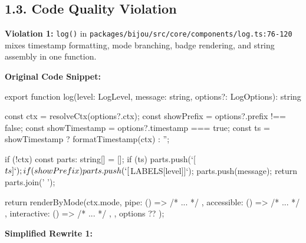 \subsection{1.3. Code Quality Violation}\label{record-418-code-quality-violation}

\textbf{Violation 1:} \texttt{l\allowbreak{}o\allowbreak{}g\allowbreak{}(\allowbreak{})} in \texttt{p\allowbreak{}a\allowbreak{}c\allowbreak{}k\allowbreak{}a\allowbreak{}g\allowbreak{}e\allowbreak{}s\allowbreak{}/\allowbreak{}b\allowbreak{}i\allowbreak{}j\allowbreak{}o\allowbreak{}u\allowbreak{}/\allowbreak{}s\allowbreak{}r\allowbreak{}c\allowbreak{}/\allowbreak{}c\allowbreak{}o\allowbreak{}r\allowbreak{}e\allowbreak{}/\allowbreak{}c\allowbreak{}o\allowbreak{}m\allowbreak{}p\allowbreak{}o\allowbreak{}n\allowbreak{}e\allowbreak{}n\allowbreak{}t\allowbreak{}s\allowbreak{}/\allowbreak{}l\allowbreak{}o\allowbreak{}g\allowbreak{}.\allowbreak{}t\allowbreak{}s\allowbreak{}:\allowbreak{}7\allowbreak{}6\allowbreak{}-\allowbreak{}1\allowbreak{}2\allowbreak{}0} mixes timestamp formatting, mode branching, badge rendering, and string assembly in one function.

\textbf{Original Code Snippet:}

\begin{CodeBlock}
export function log(level: LogLevel, message: string, options?: LogOptions): string {
  const ctx = resolveCtx(options?.ctx);
  const showPrefix = options?.prefix !== false;
  const showTimestamp = options?.timestamp === true;
  const ts = showTimestamp ? formatTimestamp(ctx) : '';

  if (!ctx) {
    const parts: string[] = [];
    if (ts) parts.push(`[${ts}]`);
    if (showPrefix) parts.push(`[${LABELS[level]}]`);
    parts.push(message);
    return parts.join(' ');
  }

  return renderByMode(ctx.mode, {
    pipe: () => { /* ... */ },
    accessible: () => { /* ... */ },
    interactive: () => { /* ... */ },
  }, options ?? {});
}
\end{CodeBlock}

\textbf{Simplified Rewrite 1:}

